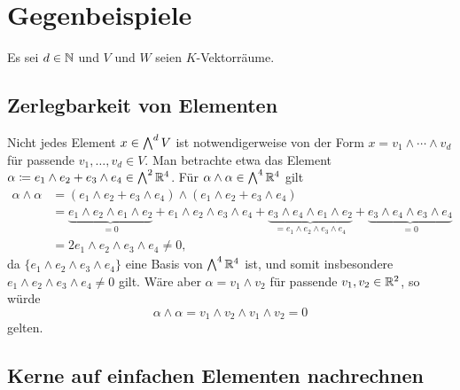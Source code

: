 \section{Gegenbeispiele}

Es sei $d \in \mathbb{N}$ und $V$ und $W$ seien $K$-Vektorräume.





\subsection{Zerlegbarkeit von Elementen}

Nicht jedes Element $x \in \bigwedge^{d} V$ ist notwendigerweise von der Form $x = v_1 \wedge \dotsb \wedge v_d$ für passende $v_1, \dotsc, v_d \in V$.
Man betrachte etwa das Element $\alpha \coloneqq e_1 \wedge e_2 + e_3 \wedge e_4 \in \bigwedge^{2} \mathbb{R}^4$.
Für $\alpha \wedge \alpha \in \bigwedge^{4} \mathbb{R}^4$ gilt
\begin{align*}
        \alpha \wedge \alpha
  &=    (e_1 \wedge e_2 + e_3 \wedge e_4) \wedge (e_1 \wedge e_2 + e_3 \wedge e_4)
  \\
  &=      \underbrace{e_1 \wedge e_2 \wedge e_1 \wedge e_2}_{=0}
        + e_1 \wedge e_2 \wedge e_3 \wedge e_4
        + \underbrace{e_3 \wedge e_4 \wedge e_1 \wedge e_2}_{= e_1 \wedge e_2 \wedge e_3 \wedge e_4}
        + \underbrace{e_3 \wedge e_4 \wedge e_3 \wedge e_4}_{=0}
  \\
  &=    2 e_1 \wedge e_2 \wedge e_3 \wedge e_4
   \neq 0,
\end{align*}
da $\{e_1 \wedge e_2 \wedge e_3 \wedge e_4\}$ eine Basis von $\bigwedge^{4} \mathbb{R}^4$ ist, und somit insbesondere $e_1 \wedge e_2 \wedge e_3 \wedge e_4 \neq 0$ gilt.
Wäre aber $\alpha = v_1 \wedge v_2$ für passende $v_1, v_2 \in \mathbb{R}^2$, so würde
\[
    \alpha \wedge \alpha
  = v_1 \wedge v_2 \wedge v_1 \wedge v_2
  = 0
\]
gelten.





\subsection{Kerne auf einfachen Elementen nachrechnen}

